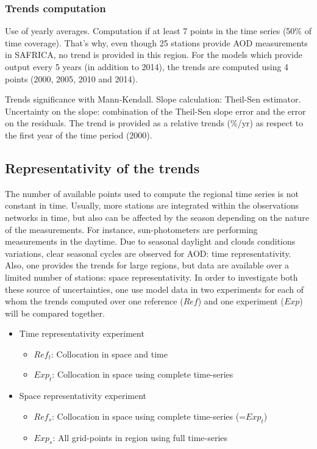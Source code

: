 \documentclass[journal abbreviation, manuscript]{copernicus}
\begin{document}
\subsubsection{Trends computation}
Use of yearly averages. Computation if at least 7 points in the time series (50\% of time coverage). That's why, even though 25 stations provide AOD measurements in SAFRICA, no trend is provided in this region. For the models which provide output every 5 years (in addition to 2014), the trends are computed using 4 points (2000, 2005, 2010 and 2014).

Trends significance with Mann-Kendall.
Slope calculation: Theil-Sen estimator.
Uncertainty on the slope: combination of the Theil-Sen slope error and the error on the residuals.
The trend is provided as a relative trends (\%/yr) as respect to the first year of the time period (2000).

\subsection{Representativity of the trends}
The number of available points used to compute the regional time series is not constant in time. Usually, more stations are integrated within the observations networks in time, but also can be affected by the season depending on the nature of the measurements. For instance, sun-photometers are performing measurements in the daytime. Due to seasonal daylight and clouds conditions variations, clear seasonal cycles are observed for AOD: time representativity.
Also, one provides the trends for large regions, but data are available over a limited number of stations: space representativity.
In order to investigate both these source of uncertainties, one use model data in two experiments for each of whom the trends computed over one reference ($Ref$) and one experiment ($Exp$) will be compared together.
\begin{itemize}
 \item Time representativity experiment
       \begin{itemize}
        \item $Ref_{t}$: Collocation in space and time
        \item $Exp_{t}$: Collocation in space using complete time-series
       \end{itemize}
 \item Space representativity experiment
       \begin{itemize}
        \item $Ref_{s}$: Collocation in space using complete time-series (=$Exp_{t}$)
        \item $Exp_{s}$: All grid-points in region using full time-series
       \end{itemize}
\end{itemize}
\end{document}
